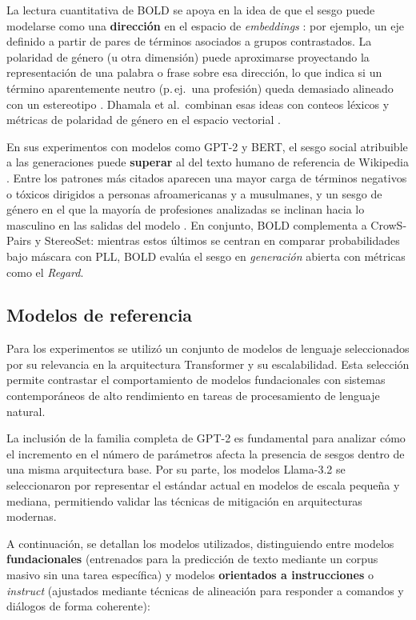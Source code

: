 \documentclass[12pt,a4paper]{report}
\begin{document}
La lectura cuantitativa de BOLD se apoya en la idea de que el sesgo puede modelarse como una \textbf{dirección} en el espacio de \textit{embeddings} \cite{bolukbasi_man_2016}: por ejemplo, un eje definido a partir de pares de términos asociados a grupos contrastados. La polaridad de género (u otra dimensión) puede aproximarse proyectando la representación de una palabra o frase sobre esa dirección, lo que indica si un término aparentemente neutro (p.\,ej.\ una profesión) queda demasiado alineado con un estereotipo \cite{bolukbasi_man_2016,dhamala_bold_2021}. Dhamala et al.\ combinan esas ideas con conteos léxicos y métricas de polaridad de género en el espacio vectorial \cite{dhamala_bold_2021}.

En sus experimentos con modelos como GPT-2 y BERT, el sesgo social atribuible a las generaciones puede \textbf{superar} al del texto humano de referencia de Wikipedia \cite{dhamala_bold_2021}. Entre los patrones más citados aparecen una mayor carga de términos negativos o tóxicos dirigidos a personas afroamericanas y a musulmanes, y un sesgo de género en el que la mayoría de profesiones analizadas se inclinan hacia lo masculino en las salidas del modelo \cite{dhamala_bold_2021}. En conjunto, BOLD complementa a CrowS-Pairs y StereoSet: mientras estos últimos se centran en comparar probabilidades bajo máscara con PLL, BOLD evalúa el sesgo en \textit{generación} abierta con métricas como el \textit{Regard}.

\subsection{Modelos de referencia}
\label{sec:modelos_referencia}

Para los experimentos se utilizó un conjunto de modelos de lenguaje seleccionados por su relevancia en la arquitectura Transformer y su escalabilidad. Esta selección permite contrastar el comportamiento de modelos fundacionales con sistemas contemporáneos de alto rendimiento en tareas de procesamiento de lenguaje natural.

La inclusión de la familia completa de GPT-2 es fundamental para analizar cómo el incremento en el número de parámetros afecta la presencia de sesgos dentro de una misma arquitectura base. Por su parte, los modelos Llama-3.2 se seleccionaron por representar el estándar actual en modelos de escala pequeña y mediana, permitiendo validar las técnicas de mitigación en arquitecturas modernas.

A continuación, se detallan los modelos utilizados, distinguiendo entre modelos \textbf{fundacionales} (entrenados para la predicción de texto mediante un corpus masivo sin una tarea específica) y modelos \textbf{orientados a instrucciones} o \textit{instruct} (ajustados mediante técnicas de alineación para responder a comandos y diálogos de forma coherente):
\end{document}
